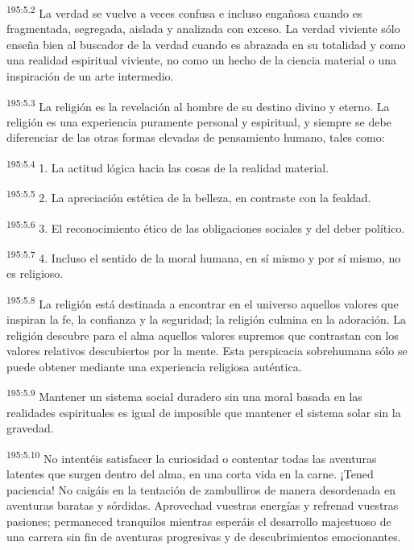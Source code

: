 \par 
\textsuperscript{195:5.2} La verdad se vuelve a veces confusa e incluso engañosa cuando es fragmentada, segregada, aislada y analizada con exceso. La verdad viviente sólo enseña bien al buscador de la verdad cuando es abrazada en su totalidad y como una realidad espiritual viviente, no como un hecho de la ciencia material o una inspiración de un arte intermedio.

\par 
\textsuperscript{195:5.3} La religión es la revelación al hombre de su destino divino y eterno. La religión es una experiencia puramente personal y espiritual, y siempre se debe diferenciar de las otras formas elevadas de pensamiento humano, tales como:

\par 
\textsuperscript{195:5.4} 1. La actitud lógica hacia las cosas de la realidad material.

\par 
\textsuperscript{195:5.5} 2. La apreciación estética de la belleza, en contraste con la fealdad.

\par 
\textsuperscript{195:5.6} 3. El reconocimiento ético de las obligaciones sociales y del deber político.

\par 
\textsuperscript{195:5.7} 4. Incluso el sentido de la moral humana, en sí mismo y por sí mismo, no es religioso.

\par 
\textsuperscript{195:5.8} La religión está destinada a encontrar en el universo aquellos valores que inspiran la fe, la confianza y la seguridad; la religión culmina en la adoración. La religión descubre para el alma aquellos valores supremos que contrastan con los valores relativos descubiertos por la mente. Esta perspicacia sobrehumana sólo se puede obtener mediante una experiencia religiosa auténtica.

\par 
\textsuperscript{195:5.9} Mantener un sistema social duradero sin una moral basada en las realidades espirituales es igual de imposible que mantener el sistema solar sin la gravedad.

\par 
\textsuperscript{195:5.10} No intentéis satisfacer la curiosidad o contentar todas las aventuras latentes que surgen dentro del alma, en una corta vida en la carne. ¡Tened paciencia! No caigáis en la tentación de zambulliros de manera desordenada en aventuras baratas y sórdidas. Aprovechad vuestras energías y refrenad vuestras pasiones; permaneced tranquilos mientras esperáis el desarrollo majestuoso de una carrera sin fin de aventuras progresivas y de descubrimientos emocionantes.

